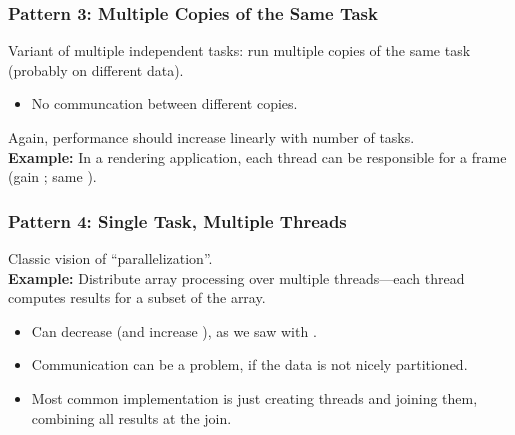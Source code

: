\begin{frame}
  \frametitle{Pattern 3: Multiple Copies of the Same Task}

  
    Variant of multiple independent tasks: run multiple copies of the same task (probably on different data).

  \begin{itemize}
    \item No communcation between different copies.
  \end{itemize}

  Again, performance should increase linearly with number of tasks.\\[1em]

  {\bf Example:} In a rendering application, each thread can be
      responsible for a frame (gain ; same
      ).

  
\end{frame}

\begin{frame}
  \frametitle{Pattern 4: Single Task, Multiple Threads}

  
  Classic vision of ``parallelization''.\\[1em]

  {\bf Example:} Distribute array processing over multiple 
      threads---each thread computes results for a subset of the array.

  \begin{itemize}
    \item Can decrease  (and increase
      ), as we saw with .
    \item Communication can be a problem, if the data is not nicely partitioned.
    \item Most common implementation is just creating threads and joining them,
      combining all results at the join.
  \end{itemize}
  
\end{frame}

